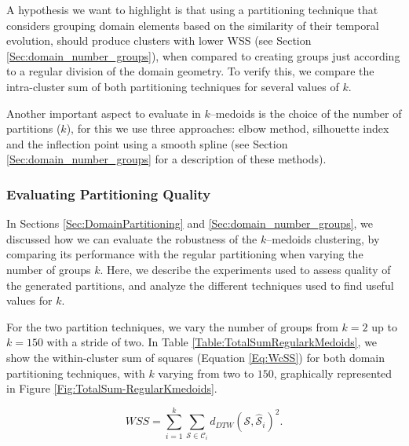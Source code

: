 A hypothesis we want to highlight is that using a partitioning technique that considers grouping domain elements based on the similarity of their temporal evolution, should produce clusters with lower WSS (see Section \ref{Sec:domain_number_groups}), when compared to creating groups just according to a regular division of the domain geometry. To verify this, we compare the intra-cluster sum of both partitioning techniques for several values of $k$.

Another important aspect to evaluate in $k$--medoids is the choice of the number of partitions ($k$), for this we use three approaches: elbow method, silhouette index and the inflection point using a smooth spline (see Section \ref{Sec:domain_number_groups} for a description of these methods).

\subsubsection{Evaluating Partitioning Quality}
\label{Sec:EvaluatingPP}

In Sections \ref{Sec:DomainPartitioning} and \ref{Sec:domain_number_groups}, we discussed how we can evaluate the robustness of the $k$--medoids clustering, by comparing its performance with the regular partitioning when varying the number of groups $k$. Here, we describe the experiments used to assess quality of the generated partitions, and analyze the different techniques used to find useful values for $k$.  

For the two partition techniques, we vary the number of groups from $k=2$ up to $k=150$ with a stride of two. In Table \ref{Table:TotalSumRegularkMedoids}, we show the within-cluster sum of squares (Equation \ref{Eq:WcSS}) for both domain partitioning techniques, with $k$ varying from two to $150$, graphically represented in Figure \ref{Fig:TotalSum-RegularKmedoids}. 

\begin{equation}
    \label{Eq:WcSS}
    WSS = \sum_{i=1}^{k} \sum_{\mathcal{S} \in \mathcal{C}_{i}} d_{DTW} \left(\mathcal{S}, \mathcal{\hat{S}}_{i}\right)^{2}.
\end{equation}

